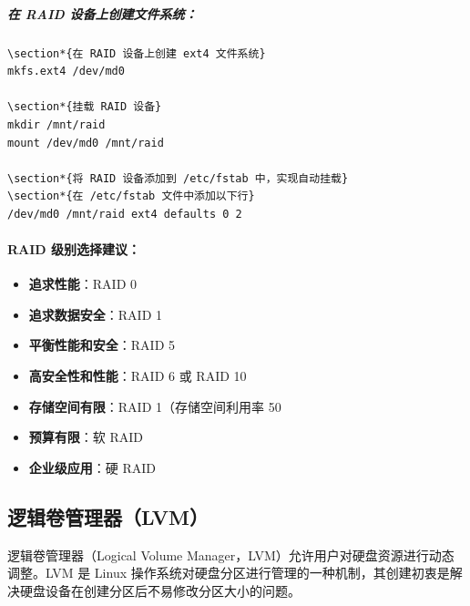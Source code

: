 \documentclass[12pt,UTF8]{ctexbook}
\begin{document}
\subparagraph{在 RAID 设备上创建文件系统：}
\begin{verbatim}
\section*{在 RAID 设备上创建 ext4 文件系统}
mkfs.ext4 /dev/md0

\section*{挂载 RAID 设备}
mkdir /mnt/raid
mount /dev/md0 /mnt/raid

\section*{将 RAID 设备添加到 /etc/fstab 中，实现自动挂载}
\section*{在 /etc/fstab 文件中添加以下行}
/dev/md0 /mnt/raid ext4 defaults 0 2
\end{verbatim}

\paragraph{RAID 级别选择建议：}
\begin{itemize}
    \item \textbf{追求性能}：RAID 0
    \item \textbf{追求数据安全}：RAID 1
    \item \textbf{平衡性能和安全}：RAID 5
    \item \textbf{高安全性和性能}：RAID 6 或 RAID 10
    \item \textbf{存储空间有限}：RAID 1（存储空间利用率 50%
    \item \textbf{预算有限}：软 RAID
    \item \textbf{企业级应用}：硬 RAID
\end{itemize}

\subsection{逻辑卷管理器（LVM）}
\label{lvm}

逻辑卷管理器（Logical Volume Manager，LVM）允许用户对硬盘资源进行动态调整。LVM 是 Linux 操作系统对硬盘分区进行管理的一种机制，其创建初衷是解决硬盘设备在创建分区后不易修改分区大小的问题。
\end{document}
